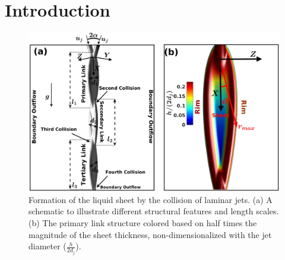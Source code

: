 \documentclass{jfm}
\begin{document}
\section{Introduction}
\begin{figure}
	\centering
	\includegraphics[width=0.75\linewidth]{Figure1}
	\caption{Formation of the liquid sheet by the collision of laminar jets. (a) A schematic to illustrate different structural features and length scales. (b) The primary link structure colored based on half times the magnitude of the sheet thickness, non-dimensionalized with the jet diameter ($\frac{h}{2d_j}$).}
	\label{Figure::schematic}\vspace{-5mm}
\end{figure}
\end{document}
